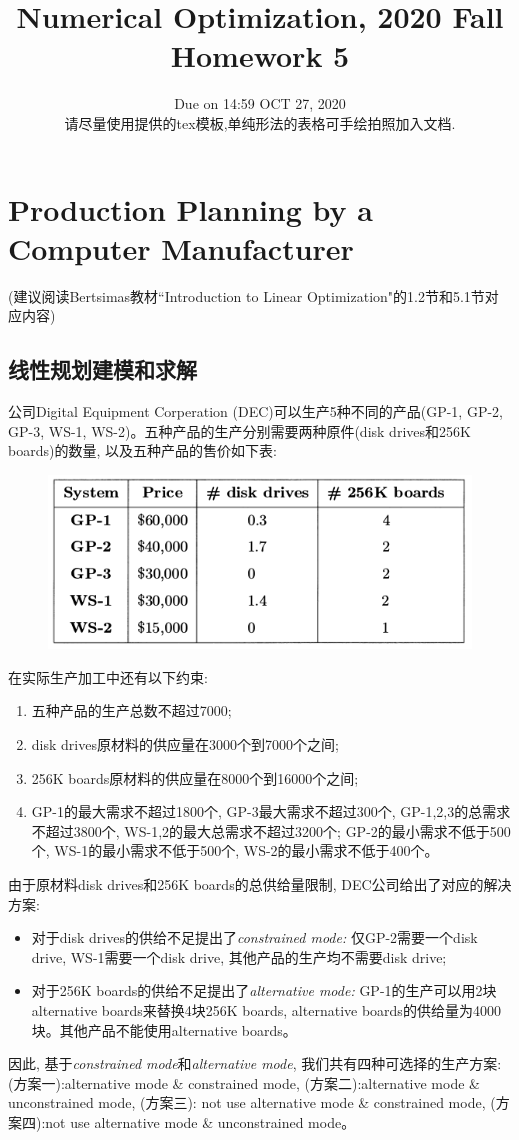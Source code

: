 \documentclass[10pt]{article}
\begin{document}
	
\title{	Numerical Optimization, 2020 Fall\\Homework 5}
\date{Due on 14:59 OCT 27, 2020\\
	请尽量使用提供的tex模板,单纯形法的表格可手绘拍照加入文档.
	}
\maketitle

\section*{Production Planning by a Computer Manufacturer}
{\color{red}(建议阅读Bertsimas教材``Introduction to Linear Optimization"的1.2节和5.1节对应内容)}
\subsection*{线性规划建模和求解}
公司Digital Equipment Corperation (DEC)可以生产5种不同的产品(GP-1, GP-2, GP-3, WS-1, WS-2)。五种产品的生产分别需要两种原件(disk drives和256K boards)的数量, 以及五种产品的售价如下表:
\begin{figure}[H]
	\centering
	\includegraphics[width=0.55\linewidth]{HW5_1.png}
	\label{fig.prob1}
\end{figure}
\noindent
在实际生产加工中还有以下约束:
\begin{enumerate}
	\item 五种产品的生产总数不超过7000;
	\item disk drives原材料的供应量在3000个到7000个之间;
	\item 256K boards原材料的供应量在8000个到16000个之间;
	\item GP-1的最大需求不超过1800个, GP-3最大需求不超过300个, GP-1,2,3的总需求不超过3800个, WS-1,2的最大总需求不超过3200个; GP-2的最小需求不低于500个, WS-1的最小需求不低于500个, WS-2的最小需求不低于400个。
\end{enumerate}
由于原材料disk drives和256K boards的总供给量限制, DEC公司给出了对应的解决方案:
\begin{itemize}
	\item 对于disk drives的供给不足提出了\emph{constrained mode:} 仅GP-2需要一个disk drive, WS-1需要一个disk drive, 其他产品的生产均不需要disk drive;
	\item 对于256K boards的供给不足提出了\emph{alternative mode:} GP-1的生产可以用2块alternative boards来替换4块256K boards, alternative boards的供给量为4000块。其他产品不能使用alternative boards。
\end{itemize}
因此, 基于\emph{constrained mode}和\emph{alternative mode}, 我们共有四种可选择的生产方案: 
(方案一):{alternative mode} \& {constrained mode}, (方案二):{alternative mode} \& {unconstrained mode}, (方案三): not use {alternative mode} \& {constrained mode}, (方案四):not use {alternative mode} \& {unconstrained mode}。
\end{document}
